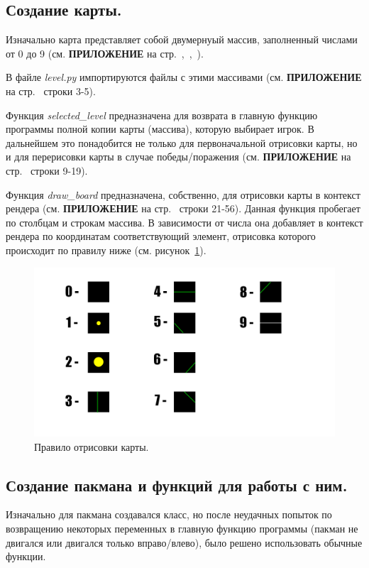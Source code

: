 \subsection{\label{subsec:ch02/sec01/sub04}Создание карты.}
Изначально карта представляет собой двумернуый массив, заполненный числами от 0 до 9 (см. \textbf{\textsc{ПРИЛОЖЕНИЕ}} на стр.~\pageref{code:b1},~\pageref{code:b2},~\pageref{code:b3}).

В файле \textit{level.py} импортируются файлы с этими массивами (см. \textbf{\textsc{ПРИЛОЖЕНИЕ}} на стр.~\pageref{code:level} строки 3-5).

Функция \textit{selected\_level} предназначена для возврата в главную функцию программы полной копии карты (массива), которую выбирает игрок. В дальнейшем это понадобится не только для первоначальной отрисовки карты, но и для перерисовки карты в случае победы/поражения (см. \textbf{\textsc{ПРИЛОЖЕНИЕ}} на стр.~\pageref{code:level} строки 9-19).

Функция \textit{draw\_board} предназначена, собственно, для отрисовки карты в контекст рендера (см. \textbf{\textsc{ПРИЛОЖЕНИЕ}} на стр.~\pageref{code:level} строки 21-56). Данная функция пробегает по столбцам и строкам массива. В зависимости от числа она добавляет в контекст рендера по координатам соответствующий элемент, отрисовка которого происходит по правилу ниже (см. рисунок~\ref{fig1}).
\begin{figure}[H]
	\centering
	\includegraphics[width=1\linewidth]{images/карта.png}
	\caption{Правило отрисовки карты.}
	\label{fig1}
\end{figure}

\subsection{\label{subsec:ch02/sec01/sub05}Создание пакмана и функций для работы с ним.}
Изначально для пакмана создавался класс, но после неудачных попыток по возвращению некоторых переменных в главную функцию программы (пакман не двигался или двигался только вправо/влево), было решено использовать обычные функции.

